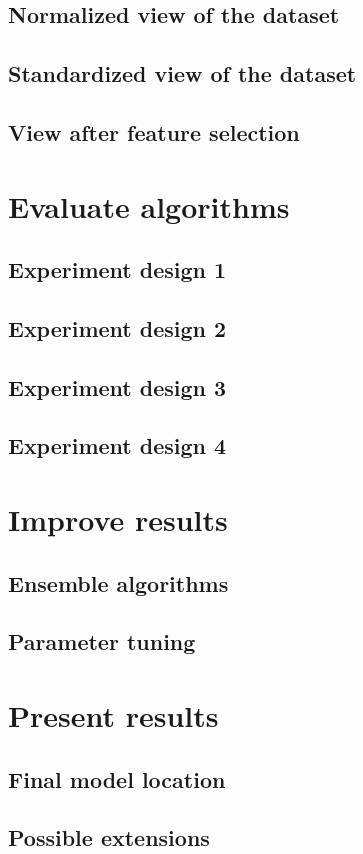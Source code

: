 \section{Normalized view of the dataset}
\section{Standardized view of the dataset}
\section{View after feature selection}

\chapter{Evaluate algorithms}

\section{Experiment design 1}
\section{Experiment design 2}
\section{Experiment design 3}
\section{Experiment design 4}

\chapter{Improve results}

\section{Ensemble algorithms}
\section{Parameter tuning}

\chapter{Present results}
\section{Final model location}
\section{Possible extensions}